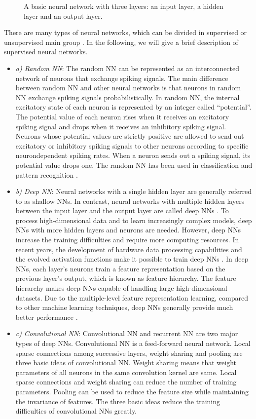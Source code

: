 \begin{itemize}
\begin{itemize}
\begin{figure}[tb!]
	\caption{A basic neural network with three layers: an input layer, a hidden layer and an output layer.}
	\label{fig:{NN_base}}
\end{figure}
There are many types of neural networks, which can be divided in supervised or unsupervised main group \cite{Lee2005}. In the following, we will give a brief description of supervised neural networks.
\begin{itemize}
\item[]\textit{a)	Random NN}: The random NN can be represented as an interconnected network of neurons that exchange spiking signals. The main difference between random NN and other neural networks is that neurons in random NN exchange spiking signals probabilistically. In random NN, the internal excitatory state of each neuron is represented by an integer called “potential”. The potential value of each neuron rises when it receives an excitatory spiking signal and drops when it receives an inhibitory spiking signal. Neurons whose potential values are strictly positive are allowed to send out excitatory or inhibitory spiking signals to other neurons according to specific neurondependent spiking rates. When a neuron sends out a spiking signal, its potential value drops one. The random NN has been used in classification and pattern recognition \cite{Timotheou2010}.
\item[]\textit{b)	Deep NN}: Neural networks with a single hidden layer are generally referred to as shallow NNs. In contrast, neural networks with multiple hidden layers between the input layer and the output layer are called deep NNs \cite{LeCun2015, Schmidhuber2015}. To process high-dimensional data and to learn increasingly complex models, deep NNs with more hidden layers and neurons are needed. However, deep NNs increase the training difficulties and require more computing resources. In recent years, the development of hardware data processing capabilities and the evolved activation functions make it possible to train deep NNs \cite{Pandey2014}. In deep NNs, each layer’s neurons train a feature representation based on the previous layer’s output, which is known as feature hierarchy. The feature hierarchy makes deep NNs capable of handling large high-dimensional datasets. Due to the multiple-level feature representation learning, compared to other machine learning techniques, deep NNs generally provide much better performance \cite{Pandey2014}.
\item[]\textit{c)	Convolutional NN}: Convolutional NN and recurrent NN are two major types of deep NNs. Convolutional NN \cite{Krizhevsky2012, Li2018} is a feed-forward neural network. Local sparse connections among successive layers, weight sharing and pooling are three basic ideas of convolutional NN. Weight sharing means that weight parameters of all neurons in the same convolution kernel are same. Local sparse connections and weight sharing can reduce the number of training parameters. Pooling can be used to reduce the feature size while maintaining the invariance of features. The three basic ideas reduce the training difficulties of convolutional NNs greatly.

\end{itemize}
\end{itemize}
\end{itemize}
